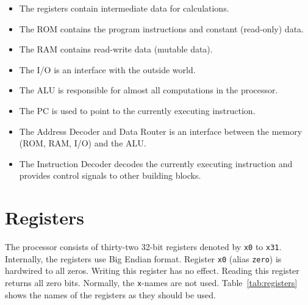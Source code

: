 \documentclass[12pt]{article}
\begin{document}
\begin{itemize}
\item The registers contain intermediate data for calculations.
\item The ROM contains the program instructions and constant (read-only) data.
\item The RAM contains read-write data (mutable data).
\item The I/O is an interface with the outside world.
\item The ALU is responsible for almost all computations in the processor.
\item The PC is used to point to the currently executing instruction.
\item The Address Decoder and Data Router is an interface between the memory (ROM, RAM, I/O) and the ALU.
\item The Instruction Decoder decodes the currently executing instruction and provides control signals to other building blocks.
\end{itemize}

\section{Registers}
The processor consists of thirty-two 32-bit registers denoted by \texttt{x0} to \texttt{x31}. Internally, the registers use Big Endian format. Register \texttt{x0} (alias \texttt{zero}) is hardwired to all zeros. Writing this register has no effect. Reading this register returns all zero bits. Normally, the \texttt{x}-names are not used. Table~\ref{tab:registers} shows the names of the registers as they should be used.
\end{document}
